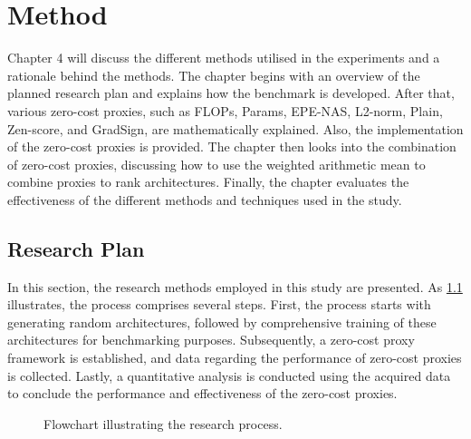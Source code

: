 \chapter{Method}\label{method}
Chapter 4 will discuss the different methods utilised in the experiments and a rationale behind the methods. The chapter begins with an overview of the planned research plan and explains how the benchmark is developed. After that, various zero-cost proxies, such as FLOPs, Params, EPE-NAS, L2-norm, Plain, Zen-score, and GradSign, are mathematically explained. Also, the implementation of the zero-cost proxies is provided. The chapter then looks into the combination of zero-cost proxies, discussing how to use the weighted arithmetic mean to combine proxies to rank architectures. Finally, the chapter evaluates the effectiveness of the different methods and techniques used in the study.

\section{Research Plan}
In this section, the research methods employed in this study are presented. As \cref{fig:research_flowchart} illustrates, the process comprises several steps. First, the process starts with generating random architectures, followed by comprehensive training of these architectures for benchmarking purposes. Subsequently, a zero-cost proxy framework is established, and data regarding the performance of zero-cost proxies is collected. Lastly, a quantitative analysis is conducted using the acquired data to conclude the performance and effectiveness of the zero-cost proxies. 
\clearpage

\begin{figure}[htbp]
\centering
{}
\caption{Flowchart illustrating the research process.}
\label{fig:research_flowchart}
\end{figure}







